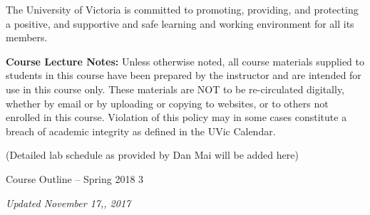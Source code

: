 The University of Victoria is committed to promoting, providing, and
protecting a positive, and supportive and safe learning and working
environment for all its members.

\textbf{Course Lecture Notes:} Unless otherwise noted, all course
materials supplied to students in this course have been prepared by the
instructor and are intended for use in this course only. These materials
are NOT to be re-circulated digitally, whether by email or by uploading
or copying to websites, or to others not enrolled in this course.
Violation of this policy may in some cases constitute a breach of
academic integrity as defined in the UVic Calendar.

(Detailed lab schedule as provided by Dan Mai will be added here)

Course Outline -- Spring 2018 3

\emph{Updated November 17,, 2017}
